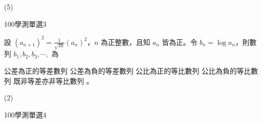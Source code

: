 \begin{QUESTIONS}
\begin{QUESTION}
        \begin{QTAGS}\end{QTAGS}
        \begin{QANS}
            (5)
        \end{QANS}
        \begin{QSOLLIST}
        \end{QSOLLIST}
        \begin{QEMPTYSPACE}
        \end{QEMPTYSPACE}
    \end{QUESTION}
    \begin{QUESTION}
        \begin{ExamInfo}{100}{學測}{單選}{3}
        \end{ExamInfo}
        \begin{ExamAnsRateInfo}{28}{56}{14}{14}
        \end{ExamAnsRateInfo}
        \begin{QBODY}
            設 $(a_{n+1})^2=\frac{1}{\sqrt{10}}(a_n)^2$，$n$ 為正整數，且知 $a_n $ 皆為正。令 $b_n=\log a_n$，則數列 $b_1, b_2,b_3,\cdots,$ 為 
			\begin{QOPS} 
				\QOP 公差為正的等差數列 
				\QOP 公差為負的等差數列 
				\QOP 公比為正的等比數列 
				\QOP 公比為負的等比數列 
				\QOP 既非等差亦非等比數列 。
			\end{QOPS}
        \end{QBODY}
        \begin{QFROMS}
        \end{QFROMS}
        \begin{QTAGS}\end{QTAGS}
        \begin{QANS}
            (2)
        \end{QANS}
        \begin{QSOLLIST}
        \end{QSOLLIST}
        \begin{QEMPTYSPACE}
        \end{QEMPTYSPACE}
    \end{QUESTION}
    \begin{QUESTION}
        \begin{ExamInfo}{100}{學測}{單選}{4}
        \end{ExamInfo}
        \begin{ExamAnsRateInfo}{30}{51}{20}{19}

\end{ExamAnsRateInfo}
\end{QUESTION}
\end{QUESTIONS}
